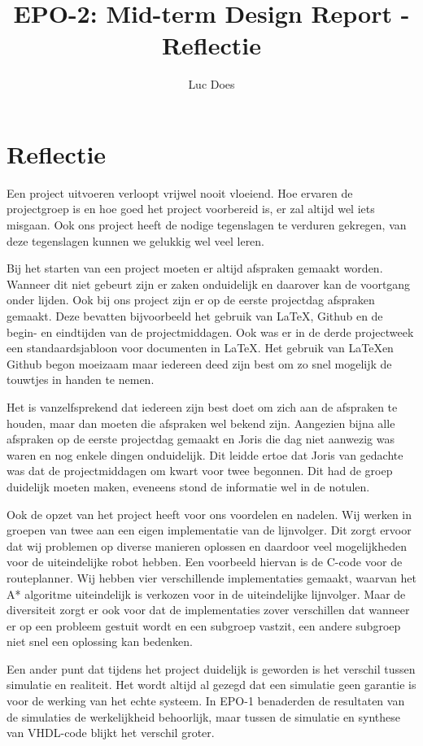 \documentclass{report}
\title{EPO-2: Mid-term Design Report - Reflectie}
\author{Luc Does}
\begin{document}
\chapter{Reflectie}
\label{ch:reflectie}

Een project uitvoeren verloopt vrijwel nooit vloeiend. Hoe ervaren de projectgroep is en hoe goed het project voorbereid is, er zal altijd wel iets misgaan. Ook ons project heeft de nodige tegenslagen te verduren gekregen, van deze tegenslagen kunnen we gelukkig wel veel leren. \newline

Bij het starten van een project moeten er altijd afspraken gemaakt worden. Wanneer dit niet gebeurt zijn er zaken onduidelijk en daarover kan de voortgang onder lijden. Ook bij ons project zijn er op de eerste projectdag afspraken gemaakt. Deze bevatten bijvoorbeeld het gebruik van \LaTeX, Github en de begin- en eindtijden van de projectmiddagen. Ook was er in de derde projectweek een standaardsjabloon voor documenten in \LaTeX. Het gebruik van \LaTeX en Github begon moeizaam maar iedereen deed zijn best om zo snel mogelijk de touwtjes in handen te nemen. \newline

Het is  vanzelfsprekend dat iedereen zijn best doet om zich aan de afspraken te houden, maar dan moeten die afspraken wel bekend zijn. Aangezien bijna alle afspraken op de eerste projectdag gemaakt en Joris die dag niet aanwezig was waren en nog enkele dingen onduidelijk. Dit leidde ertoe dat Joris van gedachte was dat de projectmiddagen om kwart voor twee begonnen. Dit had de groep duidelijk moeten maken, eveneens stond de informatie wel in de notulen. \newline

Ook de opzet van het project heeft voor ons voordelen en nadelen. Wij werken in groepen van twee aan een eigen implementatie van de lijnvolger. Dit zorgt ervoor dat wij problemen op diverse manieren oplossen en daardoor veel mogelijkheden voor de uiteindelijke robot hebben. Een voorbeeld hiervan is de C-code voor de routeplanner. Wij hebben vier verschillende implementaties gemaakt, waarvan het A* algoritme uiteindelijk is verkozen voor in de uiteindelijke lijnvolger. Maar de diversiteit zorgt er ook voor dat de implementaties zover verschillen dat wanneer er op een probleem gestuit wordt en een subgroep vastzit, een andere subgroep niet snel een oplossing kan bedenken. \newline

Een ander punt dat tijdens het project duidelijk is geworden is het verschil tussen simulatie en realiteit. Het wordt altijd al gezegd dat een simulatie geen garantie is voor de werking van het echte systeem. In EPO-1 benaderden de resultaten van de simulaties de werkelijkheid behoorlijk, maar tussen de simulatie en synthese van VHDL-code blijkt het verschil groter. \newline
\end{document}
